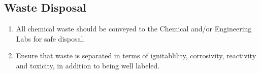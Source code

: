 \documentclass[12pt,letterpaper]{article}
\begin{document}
    	\subsection{Waste Disposal}
      		\begin{enumerate}
                    \begin{enumerate}
    				\item All chemical waste should be conveyed to the Chemical 
                        and/or Engineering Labs for safe disposal.\cite{nema2006disposal}
                        \item Ensure that waste is separated in terms of  ignitablility, corrosivity, reactivity and toxicity, in addition to being well
                        labeled.\cite{acs2007manual}
                    \end{enumerate}
                \end{enumerate}
    \pagebreak

    \printbibliography
\end{document}
